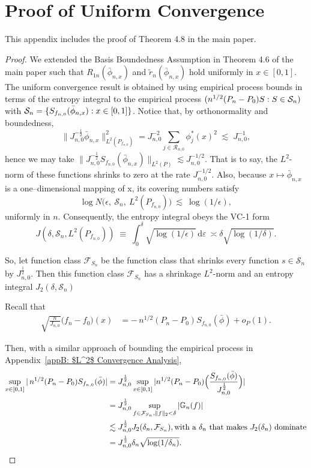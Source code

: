 \section{Proof of Uniform Convergence} \label{appendix_E: Uniform Convergence Rate}
This appendix includes the proof of Theorem 4.8 in the main paper.
\begin{proof}
We extended the Basis Boundedness Assumption in Theorem 4.6 of the main paper such that $R_{1n}(\bar{\phi}_{n,x})$ and $\tilde{r}_n(\bar{\phi}_{n,x})$ hold uniformly in $x\in [0,1]$. 
The uniform convergence result is obtained by using empirical process bounds in terms of the entropy integral to the empirical process  $(n^{1/2}(P_n-P_0)S: S\in {\cal S}_n)$ with ${\cal S}_n=\{S_{f_{n,0}}(\bar{\phi}_{n,x}):x\in [0,1]\}$. 
Notice that, by orthonormality and boundedness,
\[
\|J_{n,0}^{-\frac12}\bar\phi_{n,x}\|_{L^2(P_{f_{n,0}})}^2
=J_{n,0}^{-2}\sum_{j\in\mathcal R_{n,0}}\phi_j^*(x)^2
\;\lesssim\; J_{n,0}^{-1},
\]
hence we may take $\|J_{n,0}^{-\frac12}S_{f_{n,0}}(\bar{\phi}_{n,x})\|_{L^2(P)} \lesssim J_{n,0}^{-1/2}$. That is to say, the $L^2$-norm of these functions shrinks to zero at the rate $J_{n,0}^{-1/2}$. Also, because $x\mapsto \bar\phi_{n,x}$ is a one--dimensional mapping of x, its covering numbers satisfy
\[
\log N\!\bigl(\epsilon,\ \mathcal S_n,\ L^2(P_{f_{n,0}})\bigr)\ \lesssim\ \log(1/\epsilon),
\]
uniformly in $n$. Consequently, the entropy integral obeys the VC-1 form
\[
J(\delta,\mathcal S_n,L^2(P_{f_{n,0}}))
\;\equiv\;\int_0^\delta \sqrt{\log(1/\epsilon)}\,\mathrm{d}\varepsilon
\ \asymp \delta\sqrt{\log(1/\delta)}.
\]

So, let function class $\mathcal F_{S_n}$ be the function class that shrinks every function $s \in \mathcal S_n$ by $J_{n,0}^{\frac12}$. Then this function class $\mathcal F_{S_n}$ has a shrinkage $L^2$-norm and an entropy integral $J_2(\delta,\mathcal S_n)$

Recall that 
\begin{align*}
    \sqrt{\frac{n}{J_{n,0}}}\bigl(f_n - f_{0}\bigr)(x) 
     &= -\,n^{1/2}(P_n-P_0)S_{f_{n,0}}(\bar\phi)
     + o_P(1).
\end{align*}

Then, with a similar approach of bounding the empirical process in Appendix~\ref{appB: $L^2$ Convergence Analysis}, 
\begin{align*}
    \sup_{x\in[0,1]} |\,n^{1/2}(P_n-P_0)S_{f_{n,0}}(\bar\phi)| &=  
    J_{n,0}^{\frac12} \sup_{x\in[0,1]} |n^{1/2}(P_n-P_0) \Bigr(\frac{S_{f_{n,0}}(\bar\phi)}{J_{n,0}^{\frac12}} \Bigl) | \\
    &= J_{n,0}^{\frac12} \sup_{f \in \mathcal F_{S_n}, \|f\|_2 < \delta}|\mathbb G_n(f)| \\
    &\lesssim J_{n,0}^{\frac12} J_2(\delta_n, \mathcal F_{S_n}), \text{with a $\delta_n$ that makes $J_2(\delta_n)$ dominate} \\
    &= J_{n,0}^{\frac12} \delta_n\sqrt{\log(1/\delta_n)}.
\end{align*}


\end{proof}
